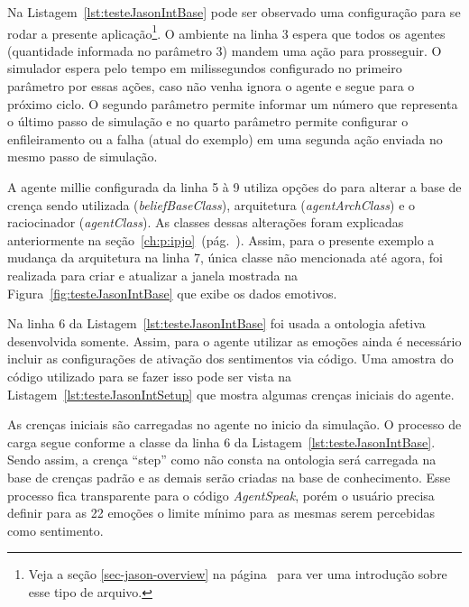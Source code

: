 Na Listagem~\ref{lst:testeJasonIntBase} pode ser observado uma configuração
para se rodar a presente aplicação\footnote{Veja a seção
\ref{sec-jason-overview} na página~\pageref{sec-jason-overview}
para ver uma introdução sobre esse tipo de arquivo.}. O ambiente na linha 3
espera que todos os agentes (quantidade informada no parâmetro 3) mandem
uma ação para prosseguir. O simulador espera pelo tempo em milissegundos
configurado no primeiro parâmetro por essas ações, caso não venha ignora o
agente e segue para o próximo ciclo. O segundo parâmetro permite informar
um número que representa o último passo de simulação e no quarto
parâmetro permite configurar o enfileiramento ou a falha (atual do exemplo) em
uma segunda ação enviada no mesmo passo de simulação.

\begin{center}
    \begin{minipage}{130mm}
	\lstset{linewidth=130mm}
	
    \end{minipage}
\end{center}

A agente millie configurada da linha 5 à 9 utiliza opções do \jason para
alterar a base de crença sendo utilizada (\emph{beliefBaseClass}),
arquitetura (\emph{agentArchClass}) e o raciocinador
(\emph{agentClass}). As classes dessas alterações foram explicadas anteriormente
na seção~\ref{ch:p:ipjo}~(pág.~\pageref{ch:p:ipjo}).
Assim, para o presente exemplo a mudança da arquitetura na linha 7, única
classe não mencionada até agora, foi realizada para criar e atualizar a janela
mostrada na Figura~\ref{fig:testeJasonIntBase} que exibe os dados emotivos.

Na linha 6 da Listagem~\ref{lst:testeJasonIntBase}
foi usada a ontologia afetiva desenvolvida somente. Assim, para o agente
utilizar as emoções ainda é necessário incluir as configurações de ativação
dos sentimentos via código. Uma amostra do código utilizado para se fazer isso
pode ser vista na Listagem~\ref{lst:testeJasonIntSetup} que mostra algumas
crenças iniciais do agente.

As crenças iniciais são carregadas no agente no inicio da simulação. O processo
de carga segue conforme a classe da linha 6 da
Listagem~\ref{lst:testeJasonIntBase}. Sendo assim, a crença ``step'' como não
consta na ontologia será carregada na base de crenças padrão e as demais serão
criadas na base de conhecimento. Esse processo fica transparente
para o código \emph{AgentSpeak}, porém o usuário precisa definir para as 22
emoções o limite mínimo para as mesmas serem percebidas como sentimento.

